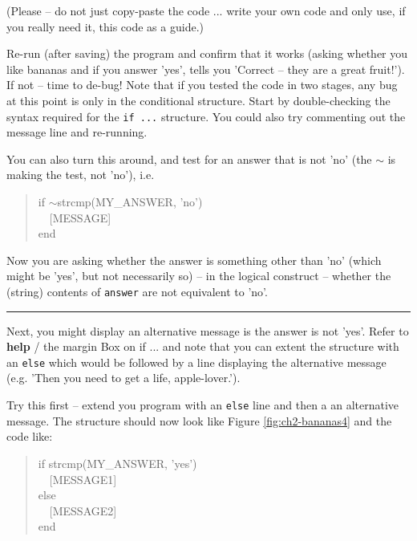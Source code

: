 \documentclass{tufte-book} %
\newenvironment{docspec}{\begin{quotation}\ttfamily\parskip0pt\parindent0pt\ignorespaces}{\end{quotation}}
\begin{document}
\noindent(Please -- do not just copy-paste the code ... write your own code and only use, if you really need it, this code as a guide.)

Re-run (after saving) the program and confirm that it works (asking whether you like bananas and if you answer 'yes', tells you 'Correct -- they are a great fruit!'). If not -- time to de-bug! Note that if you tested the code in two stages, any bug at this point is only in the conditional structure. Start by double-checking the syntax required for the \texttt{if ...} structure. You could also try commenting out the message line and re-running.

You can also turn this around, and test for an answer that is not 'no' (the \(\sim\) is making the test, not 'no'), i.e.

\begin{docspec}
if \(\sim\)strcmp(MY\_ANSWER, 'no')
\\ \ \ [MESSAGE]
\\end
\end{docspec}

\noindent Now you are asking whether the answer is something other than 'no' (which might be 'yes', but not necessarily so) -- in the logical construct -- whether the (string) contents of \texttt{answer} are not equivalent to 'no'.

\vspace{1mm}
\noindent\rule{2cm}{0.5pt}
\vspace{2mm}

\noindent Next, you might display an alternative message is the answer is not 'yes'. Refer to \textbf{help} / the margin Box on if ... and note that you can extent the structure with an \texttt{else} which would be followed by a line displaying the alternative message (e.g. 'Then you need to get a life, apple-lover.').

Try this first -- extend you program with an \texttt{else} line and then a an alternative message. The structure should now look like Figure \ref{fig:ch2-bananas4} and the code like:

\begin{docspec}
if strcmp(MY\_ANSWER, 'yes')
\\ \ \ [MESSAGE1]
\\else
\\ \ \ [MESSAGE2]
\\end
\end{docspec}
\end{document}
